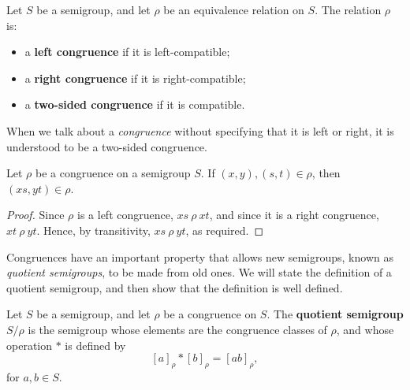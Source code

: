 \begin{definition}
  \label{def:congruence}
  Let $S$ be a semigroup, and let $\rho$ be an equivalence relation on $S$.  The
  relation $\rho$ is:
  \begin{itemize}
  \item a \textbf{left congruence} if it is left-compatible;
  \item a \textbf{right congruence} if it is right-compatible;
  \item a \textbf{two-sided congruence} if it is compatible.
  \end{itemize}
\end{definition}

When we talk about a \textit{congruence} without specifying that it is left or
right, it is understood to be a two-sided congruence.

\begin{proposition}
  \label{prop:cong-def}
  Let $\rho$ be a congruence on a semigroup $S$.  If $(x, y), (s, t) \in \rho$,
  then $(xs, yt) \in \rho$.
  \begin{proof}
    Since $\rho$ is a left congruence, $xs ~\rho~ xt$, and since it is a right
    congruence, $xt ~\rho~ yt$.  Hence, by transitivity, $xs ~\rho~ yt$, as
    required.
  \end{proof}
\end{proposition}

Congruences have an important property that allows new semigroups, known as
\textit{quotient semigroups}, to be made from old ones.  We will state the
definition of a quotient semigroup, and then show that the definition is well
defined.

\begin{definition}
  \label{def:quotient}
  Let $S$ be a semigroup, and let $\rho$ be a congruence on $S$.  The
  \textbf{quotient semigroup} $S / \rho$ is the semigroup whose elements are the
  congruence classes of $\rho$, and whose operation $*$ is defined by
  $$[a]_\rho * [b]_\rho = [ab]_\rho,$$
  for $a, b \in S$.
\end{definition}

